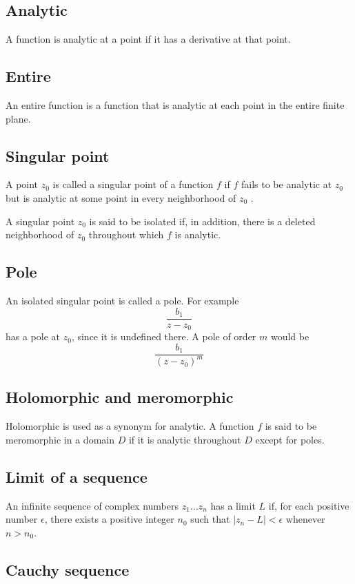 \documentclass[11pt, oneside]{article}
\begin{document}
\subsection*{Analytic}
A function is analytic at a point if it has a derivative at that point.

\subsection*{Entire}
An entire function is a function that is analytic at each point in the entire finite plane.

\subsection*{Singular point}
A point $z_0$ is called a singular point of a function $f$ if $f$ fails to be analytic at $z_0$  but is analytic at some point in every neighborhood of $z_0$ . 

A singular point $z_0$  is said to be isolated if, in addition, there is a deleted neighborhood  of $z_0$  throughout which $f$ is analytic.

\subsection*{Pole}
An isolated singular point is called a pole.  For example
\[ \frac{b_1}{z - z_0} \]
has a pole at $z_0$, since it is undefined there.  A pole of order $m$ would be
\[ \frac{b_1}{(z - z_0)^m} \]

\subsection*{Holomorphic and meromorphic}
Holomorphic is used as a synonym for analytic.  A function $f$ is said to be meromorphic in a domain $D$ if it is analytic throughout $D$ except for poles.

\subsection*{Limit of a sequence}
An infinite sequence of complex numbers $z_1 \dots z_n$ has a limit $L$ if, for each positive number $\epsilon$, there exists a positive integer $n_0$ such that $|z_n - L| < \epsilon$ whenever $n>n_0$.

\subsection*{Cauchy sequence}
\end{document}
